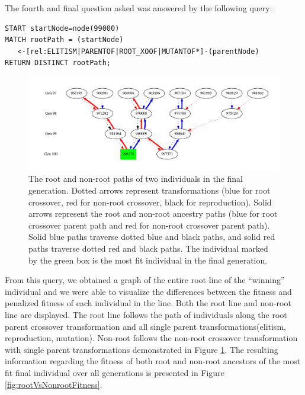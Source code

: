 \documentclass[12pt]{article}
\begin{document}
The fourth and final question asked was answered by the following query:
\begin{verbatim}
START startNode=node(99000) 
MATCH rootPath = (startNode)
   <-[rel:ELITISM|PARENTOF|ROOT_XOOF|MUTANTOF*]-(parentNode) 
RETURN DISTINCT rootPath;
\end{verbatim}

\begin{figure}[tb]
 \centering
 \includegraphics[width=\textwidth]{XO_path_example}
 \caption{The root and non-root paths of two individuals in the final generation. Dotted arrows represent transformations (blue for root crossover, red for non-root crossover, black for reproduction). Solid arrows represent the root and non-root ancestry paths (blue for root crossover parent path and red for non-root crossover parent path). Solid blue paths traverse dotted blue and black paths, and solid red paths traverse dotted red and black paths. The individual marked by the green box is the most fit individual in the final generation.}
 \label{fig:XO_path_example}
\end{figure}

From this query, we obtained a graph of the entire root line of the ``winning'' individual and we were able to visualize the differences between the fitness and penalized fitness of each individual in the line. Both the root line and non-root line are displayed. The root line follows the path of individuals along the root parent crossover transformation and all single parent transformations(elitism, reproduction, mutation). Non-root follows the non-root crossover transformation with single parent transformations demonstrated in Figure \ref{fig:XO_path_example}. The resulting information regarding the fitness of both root and non-root ancestors of the most fit final individual over all generations is presented in Figure \ref{fig:rootVsNonrootFitness}. 
\end{document}
